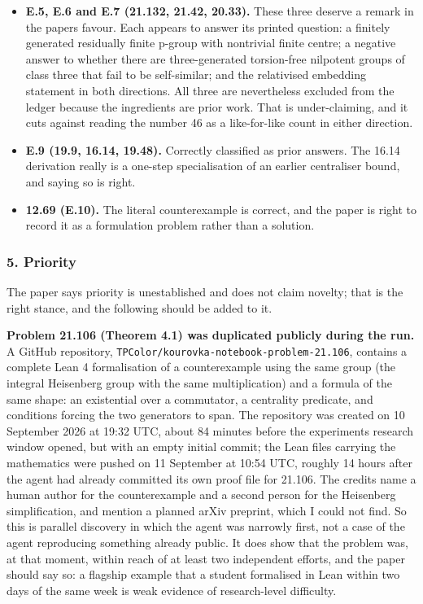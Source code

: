 \begin{itemize}
  and 18.120, and the class-two case of 6.47, are stated with their
  hypotheses in the open. The bounded searches in D.7 carry explicit
  coverage boundaries, and every number in them that I could recompute
  was exact.
\item
  \textbf{E.5, E.6 and E.7 (21.132, 21.42, 20.33).} These three deserve
  a remark in the paper\textquotesingle s favour. Each appears to answer
  its printed question: a finitely generated residually finite p-group
  with nontrivial finite centre; a negative answer to whether there are
  three-generated torsion-free nilpotent groups of class three that fail
  to be self-similar; and the relativised embedding statement in both
  directions. All three are nevertheless excluded from the ledger
  because the ingredients are prior work. That is under-claiming, and it
  cuts against reading the number 46 as a like-for-like count in either
  direction.
\item
  \textbf{E.9 (19.9, 16.14, 19.48).} Correctly classified as prior
  answers. The 16.14 derivation really is a one-step specialisation of
  an earlier centraliser bound, and saying so is right.
\item
  \textbf{12.69 (E.10).} The literal counterexample is correct, and the
  paper is right to record it as a formulation problem rather than a
  solution.
\end{itemize}

\hypertarget{review-md-priority}{%
\subsubsection*{5. Priority}\label{review-md-priority}}

The paper says priority is unestablished and does not claim novelty;
that is the right stance, and the following should be added to it.

\textbf{Problem 21.106 (Theorem 4.1) was duplicated publicly during the
run.} A GitHub repository,
\nolinkurl{TPColor/kourovka-notebook-problem-21.106}, contains a
complete Lean 4 formalisation of a counterexample using the same group
(the integral Heisenberg group with the same multiplication) and a
formula of the same shape: an existential over a commutator, a
centrality predicate, and conditions forcing the two generators to span.
The repository was created on 10 September 2026 at 19:32 UTC, about 84
minutes before the experiment\textquotesingle s research window opened,
but with an empty initial commit; the Lean files carrying the
mathematics were pushed on 11 September at 10:54 UTC, roughly 14 hours
after the agent had already committed its own proof file for 21.106. The
credits name a human author for the counterexample and a second person
for the Heisenberg simplification, and mention a planned arXiv preprint,
which I could not find. So this is parallel discovery in which the agent
was narrowly first, not a case of the agent reproducing something
already public. It does show that the problem was, at that moment,
within reach of at least two independent efforts, and the paper should
say so: a flagship example that a student formalised in Lean within two
days of the same week is weak evidence of research-level difficulty.

